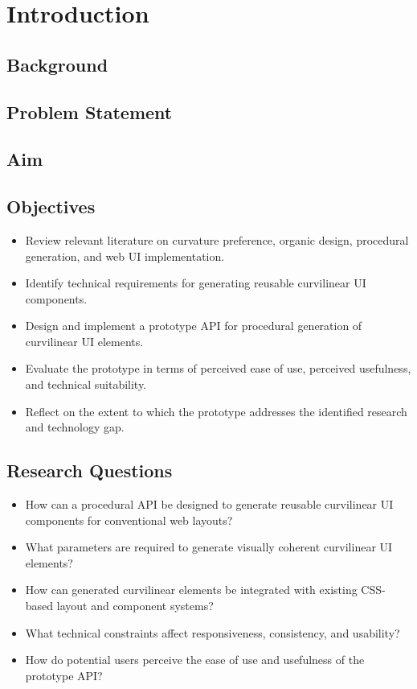 \chapter{Introduction}

\section{Background}

\section{Problem Statement}

\section{Aim}

\section{Objectives}
\begin{itemize}
  \item Review relevant literature on curvature preference, organic design, procedural generation, and web UI implementation.
  \item Identify technical requirements for generating reusable curvilinear UI components.
  \item Design and implement a prototype API for procedural generation of curvilinear UI elements.
  \item Evaluate the prototype in terms of perceived ease of use, perceived usefulness, and technical suitability.
  \item Reflect on the extent to which the prototype addresses the identified research and technology gap.
\end{itemize}

\section{Research Questions}
\begin{itemize}
  \item How can a procedural API be designed to generate reusable curvilinear UI components for conventional web layouts?
  \item What parameters are required to generate visually coherent curvilinear UI elements?
  \item How can generated curvilinear elements be integrated with existing CSS-based layout and component systems?
  \item What technical constraints affect responsiveness, consistency, and usability?
  \item How do potential users perceive the ease of use and usefulness of the prototype API?
\end{itemize}

